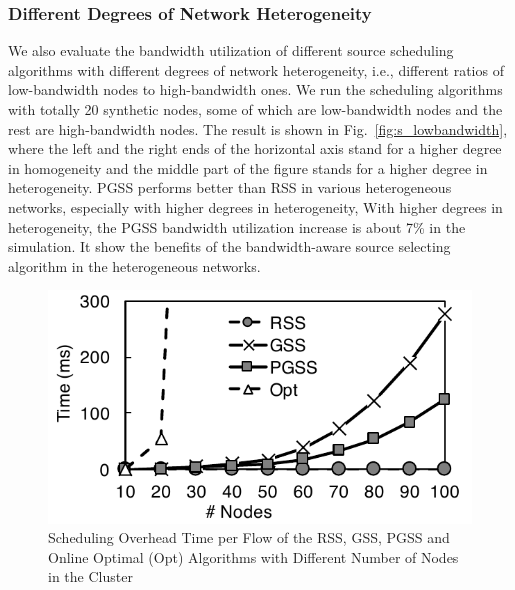 \documentclass[10pt,journal,compsoc]{IEEEtran}
\begin{document}
\subsubsection{Different Degrees of Network Heterogeneity}
We also evaluate the bandwidth utilization of different source scheduling algorithms 
with different degrees of network heterogeneity, 
i.e., different ratios of low-bandwidth nodes to high-bandwidth ones. 
We run the scheduling algorithms with totally 20 synthetic nodes, 
some of which are low-bandwidth nodes and the rest are high-bandwidth nodes. 
The result is shown in Fig.~\ref{fig:s_lowbandwidth}, 
where the left and the right ends of the horizontal axis stand for a higher
degree in homogeneity
and the middle part of the figure stands for a higher degree in heterogeneity. 
PGSS performs better than RSS in various heterogeneous networks, 
especially with higher degrees in heterogeneity, 
With higher degrees in heterogeneity, the PGSS bandwidth utilization
increase is about 7\% in the simulation. 
It show the benefits of the bandwidth-aware source selecting algorithm in the heterogeneous networks.

\begin{figure}[!t]
\centering

\includegraphics[width=0.7\columnwidth,height=0.4\columnwidth]{figure15}

\caption{Scheduling Overhead Time per Flow of the RSS, GSS, PGSS and Online Optimal (Opt) Algorithms with Different Number of Nodes in the Cluster}
\label{fig:s_overhead}
\end{figure}
\end{document}
